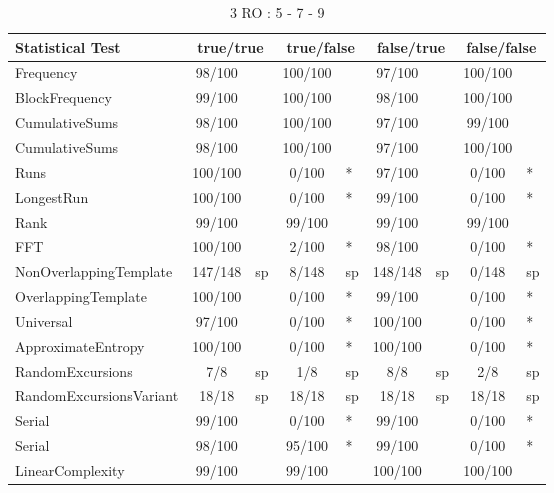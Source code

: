 \begin{table}[H]
\centering
\caption{3 RO : 5 - 7 - 9}
\label{tab:nist_22_3RO_21I}
\begin{tabular}{|l|c|l|c|l|c|l|c|l|}
\hline
\textbf{Statistical Test} & \multicolumn{2}{c|}{\textbf{true/true}} & \multicolumn{2}{c|}{\textbf{true/false}} & \multicolumn{2}{c|}{\textbf{false/true}} & \multicolumn{2}{c|}{\textbf{false/false}} \\ \hline
Frequency               &  98/100 &     & 100/100 &     &  97/100 &     & 100/100 &     \\ \hline
BlockFrequency          &  99/100 &     & 100/100 &     &  98/100 &     & 100/100 &     \\ \hline
CumulativeSums          &  98/100 &     & 100/100 &     &  97/100 &     &  99/100 &     \\ \hline
CumulativeSums          &  98/100 &     & 100/100 &     &  97/100 &     & 100/100 &     \\ \hline
Runs                    & 100/100 &     &   0/100 & *   &  97/100 &     &   0/100 & *   \\ \hline
LongestRun              & 100/100 &     &   0/100 & *   &  99/100 &     &   0/100 & *   \\ \hline
Rank                    &  99/100 &     &  99/100 &     &  99/100 &     &  99/100 &     \\ \hline
FFT                     & 100/100 &     &   2/100 & *   &  98/100 &     &   0/100 & *   \\ \hline
NonOverlappingTemplate  & 147/148 & sp  &   8/148 & sp  & 148/148 & sp  &   0/148 & sp  \\ \hline
OverlappingTemplate     & 100/100 &     &   0/100 & *   &  99/100 &     &   0/100 & *   \\ \hline
Universal               &  97/100 &     &   0/100 & *   & 100/100 &     &   0/100 & *   \\ \hline
ApproximateEntropy      & 100/100 &     &   0/100 & *   & 100/100 &     &   0/100 & *   \\ \hline
RandomExcursions        &     7/8 & sp  &     1/8 & sp  &     8/8 & sp  &     2/8 & sp  \\ \hline
RandomExcursionsVariant &   18/18 & sp  &   18/18 & sp  &   18/18 & sp  &   18/18 & sp  \\ \hline
Serial                  &  99/100 &     &   0/100 & *   &  99/100 &     &   0/100 & *   \\ \hline
Serial                  &  98/100 &     &  95/100 & *   &  99/100 &     &   0/100 & *   \\ \hline
LinearComplexity        &  99/100 &     &  99/100 &     & 100/100 &     & 100/100 &     \\ \hline
\end{tabular}
\end{table}

